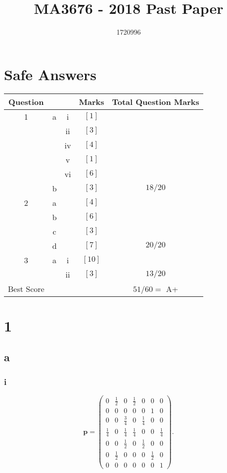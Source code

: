 \documentclass{article}
\title{MA3676 -  2018 Past Paper}
\author{1720996}
\begin{document}
\maketitle
\tableofcontents
\pagebreak

\section{Safe Answers}
\begin{table}[h]
    \centering
    \begin{tabular}{|c|c|c|c|c|}
        \hline
        Question & & & Marks & Total Question Marks\\
        \hline
        1 & a & i & $[1]$ &  \\
         & & ii & $[3]$ & \\
         & & iv & $[4]$ & \\
         & & v & $[1]$ & \\
         & & vi & $[6]$ & \\
         & b & & $[3]$ & $18/20$ \\
         \hline
        2 & a & & $[4]$ & \\
         & b & & $[6]$ & \\
         & c & & $[3]$ & \\
         & d & & $[7]$ & $20/20$ \\
        \hline
        3 & a & i & $[10]$ & \\
         & & ii & $[3]$ & $13/20$\\
        \hline
        Best Score & & & & $51/60=$ A+ \\
        \hline
    \end{tabular}
    \label{tab:safe}
\end{table}

\section{1}
\subsection{a}
\subsubsection{i}
\begin{equation}
    \mathbf{p} = \begin{pmatrix}
        0 & \frac{1}{2} & 0 & \frac{1}{2} & 0 & 0 & 0 \\
        0 & 0 & 0 & 0 & 0 & 1 & 0 \\
        0 & 0 & \frac{3}{4} & 0 & \frac{1}{4} & 0 & 0 \\
        \frac{1}{4} & 0 & \frac{1}{4} & \frac{1}{4} & 0 & 0 & \frac{1}{4} \\
        0 & 0 & \frac{1}{2} & 0 & \frac{1}{2} & 0 & 0 \\
        0 & \frac{1}{2}  & 0 & 0 & 0 & \frac{1}{2} & 0 \\
        0 & 0 & 0 & 0 & 0 & 0 & 1
    \end{pmatrix}.
\end{equation}
\end{document}
